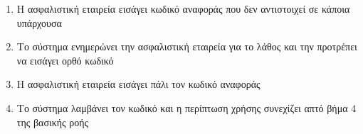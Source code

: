 \documentclass{../ol-softwaremanual}
\begin{document}
\begin{enumerate}
	\item  Η ασφαλιστική εταιρεία εισάγει κωδικό αναφοράς που δεν αντιστοιχεί σε κάποια υπάρχουσα
	\item  Το σύστημα ενημερώνει την ασφαλιστική εταιρεία για το λάθος και την προτρέπει  να εισάγει ορθό κωδικό 
	\item  Η ασφαλιστική εταιρεία εισάγει πάλι τον κωδικό  αναφοράς
	\item  Το σύστημα λαμβάνει τον κωδικό και η περίπτωση χρήσης συνεχίζει απτό βήμα 4 της βασικής ροής
\end{enumerate}
\end{document}
